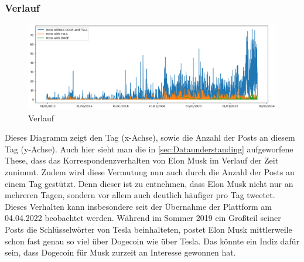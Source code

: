 \documentclass{article}
\begin{document}
\subsubsection{Verlauf}
\begin{figure}[!htb]
  	\includegraphics[width=\textwidth, center]{../imgs/Verlauf.png}
 	\caption{Verlauf}
 	\label{fig:Verlauf}
\end{figure}
Dieses Diagramm zeigt den Tag (x-Achse), sowie die Anzahl der Posts an diesem Tag (y-Achse). Auch hier sieht man die in \ref{sec:Dataunderstanding} aufgeworfene These, dass das Korrespondenzverhalten von Elon Musk im Verlauf der Zeit zunimmt.
Zudem wird diese Vermutung nun auch durch die Anzahl der Posts an einem Tag gestützt.
Denn dieser ist zu entnehmen, dass Elon Musk nicht nur an mehreren Tagen, sondern vor allem auch deutlich häufiger pro Tag tweetet.
Dieses Verhalten kann insbesondere seit der Übernahme der Plattform am 04.04.2022 beobachtet werden.
Während im Sommer 2019 ein Großteil seiner Posts die Schlüsselwörter von Tesla beinhalteten, postet Elon Musk mittlerweile schon fast genau so viel über Dogecoin wie über Tesla. Das könnte ein Indiz dafür sein, dass Dogecoin für Musk zurzeit an Interesse gewonnen hat.
\end{document}
